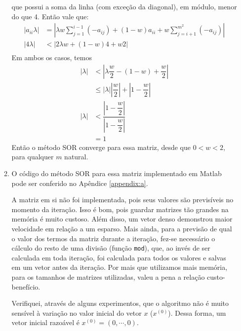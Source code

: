 \documentclass{article}
\begin{document}
\begin{enumerate}
\begin{enumerate}
                    que possui a soma da linha (com exceção da diagonal), em módulo, menor do que 4. Então vale que:
                    \begin{align*}
                        |a_{ii} \lambda| &= \left|\lambda w \sum_{j=1}^{i-1} (-a_{ij}) + (1-w)a_{ii} + w \sum_{j=i+1}^{m^2} (-a_{ij})\right| \\
                        |4 \lambda| &< \left|2\lambda w + (1-w)4 + w 2\right| \\
                    \end{align*}
                    Em ambos os casos, temos
                    \begin{align*}
                        |\lambda| &< \left|\lambda \dfrac{w}{2} - (1-w) + \dfrac{w}{2} \right| \\
                        & \le |\lambda| \left|\dfrac{w}{2}\right| + \left|1 - \dfrac{w}{2}\right| \\
                        |\lambda| &< \dfrac{\left|1 - \dfrac{w}{2}\right|}{\left|1 - \dfrac{w}{2}\right|} \\
                        &= 1
                    \end{align*}
                    Então o método SOR converge para essa matriz, desde que $0 < w < 2$, para qualquer $m$ natural.

                \item O código do método SOR para essa matriz implementado em Matlab pode ser conferido no Apêndice \ref{appendix:a}.
                
                    A matriz em si não foi implementada, pois seus valores são previsíveis no momento da iteração.
                    Isso é bom, pois guardar matrizes tão grandes na memória é muito custoso.
                    Além disso, um vetor denso demonstrou maior velocidade em relação a um esparso.
                    Mais ainda, para a previsão de qual o valor dos termos da matriz durante a iteração, fez-se necessário
                    o cálculo do resto de uma divisão (função \lstinline{mod}), que, ao invés de ser calculada em toda iteração,
                    foi calculada para todos os valores e salvas em um vetor antes da iteração. Por mais que utilizamos mais memória,
                    para os tamanhos de matrizes utilizadas, valeu a pena a relação custo-benefício.

                    Verifiquei, através de alguns experimentos, que o algoritmo não é muito sensível à variação no valor inicial do vetor $x$ ($x^{(0)}$).
                    Dessa forma, um vetor inicial razoável é $x^{(0)}=(0, \cdots, 0)$.


\end{enumerate}
\end{enumerate}
\end{document}
